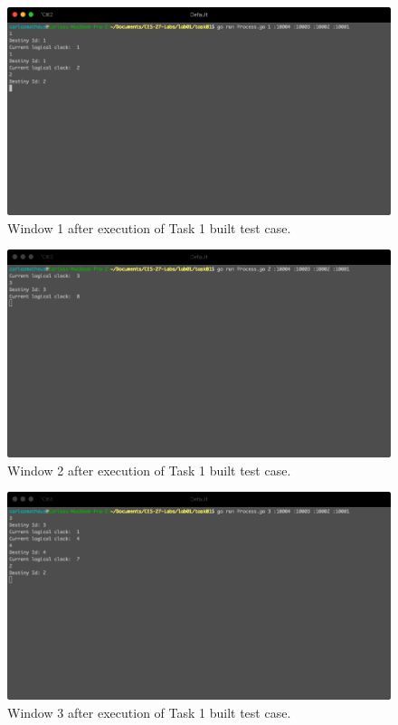 \documentclass[a4paper, 11pt]{article}
\begin{document}
\begin{figure}[h]
  \begin{center}
  \includegraphics[width=4.5in]{./imgs/task1_buit_test_window1.png}
  \caption{Window 1 after execution of Task 1 built test case.}
  \label{img_task1_built_case_window1}
  \end{center}
\end{figure}

\begin{figure}[h]
  \begin{center}
  \includegraphics[width=4.5in]{./imgs/task1_buit_test_window2.png}
  \caption{Window 2 after execution of Task 1 built test case.}
  \label{img_task1_built_case_window2}
  \end{center}
\end{figure}

\begin{figure}[h]
  \begin{center}
  \includegraphics[width=4.5in]{./imgs/task1_buit_test_window3.png}
  \caption{Window 3 after execution of Task 1 built test case.}
  \label{img_task1_built_case_window3}
  \end{center}
\end{figure}
\end{document}
